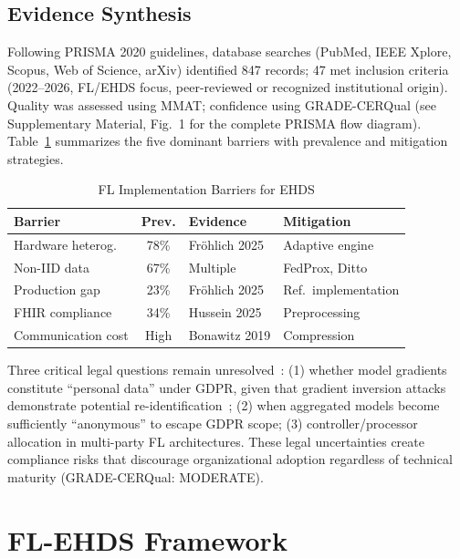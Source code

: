 \documentclass[conference,a4paper]{IEEEtran}
\begin{document}
\subsection{Evidence Synthesis}

Following PRISMA 2020 guidelines, database searches (PubMed, IEEE Xplore, Scopus, Web of Science, arXiv) identified 847 records; 47 met inclusion criteria (2022--2026, FL/EHDS focus, peer-reviewed or recognized institutional origin). Quality was assessed using MMAT; confidence using GRADE-CERQual (see Supplementary Material, Fig.~1 for the complete PRISMA flow diagram). Table~\ref{tab:barriers} summarizes the five dominant barriers with prevalence and mitigation strategies.

\begin{table}[htbp]
\caption{FL Implementation Barriers for EHDS}
\label{tab:barriers}
\centering
\small
\begin{tabular}{p{2.0cm}cp{2.0cm}p{1.8cm}}
\toprule
\textbf{Barrier} & \textbf{Prev.} & \textbf{Evidence} & \textbf{Mitigation} \\
\midrule
Hardware heterog. & 78\% & Fr\"ohlich 2025 & Adaptive engine \\
Non-IID data & 67\% & Multiple & FedProx, Ditto \\
Production gap & 23\% & Fr\"ohlich 2025 & Ref.\ implementation \\
FHIR compliance & 34\% & Hussein 2025 & Preprocessing \\
Communication cost & High & Bonawitz 2019 & Compression \\
\bottomrule
\end{tabular}
\end{table}

Three critical legal questions remain unresolved~\cite{quinn2024gdpr}: (1) whether model gradients constitute ``personal data'' under GDPR, given that gradient inversion attacks demonstrate potential re-identification~\cite{zhu2019deep}; (2) when aggregated models become sufficiently ``anonymous'' to escape GDPR scope; (3) controller/processor allocation in multi-party FL architectures. These legal uncertainties create compliance risks that discourage organizational adoption regardless of technical maturity (GRADE-CERQual: MODERATE).

\section{FL-EHDS Framework}
\label{sec:framework}
\end{document}
